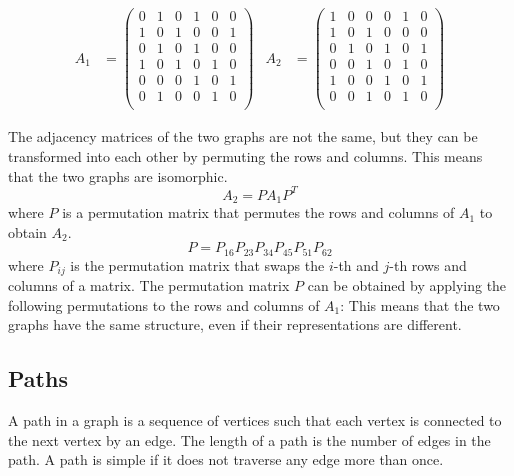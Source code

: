 \documentclass[11pt]{article}
\begin{document}
\begin{align*}
    A_1 &= \begin{pmatrix}
        0 & 1 & 0 & 1 & 0 & 0 \\
        1 & 0 & 1 & 0 & 0 & 1 \\
        0 & 1 & 0 & 1 & 0 & 0 \\
        1 & 0 & 1 & 0 & 1 & 0 \\
        0 & 0 & 0 & 1 & 0 & 1 \\
        0 & 1 & 0 & 0 & 1 & 0 \\
    \end{pmatrix} &
    A_2 &= \begin{pmatrix}
        1 & 0 & 0 & 0 & 1 & 0 \\
        1 & 0 & 1 & 0 & 0 & 0 \\
        0 & 1 & 0 & 1 & 0 & 1 \\
        0 & 0 & 1 & 0 & 1 & 0 \\
        1 & 0 & 0 & 1 & 0 & 1 \\
        0 & 0 & 1 & 0 & 1 & 0 \\
    \end{pmatrix}
\end{align*}

The adjacency matrices of the two graphs are not the same, but they can be transformed into each other by permuting the rows and columns. This means that the two graphs are isomorphic.
\[
A_2 = P A_1 P^T
\]
where $P$ is a permutation matrix that permutes the rows and columns of $A_1$ to obtain $A_2$.
\[
P = P_{16} P_{23} P_{34} P_{45} P_{51} P_{62}
\]
where $P_{ij}$ is the permutation matrix that swaps the $i$-th and $j$-th rows and columns of a matrix. The permutation matrix $P$ can be obtained by applying the following permutations to the rows and columns of $A_1$:
This means that the two graphs have the same structure, even if their representations are different.
   
\subsection{Paths}
A path in a graph is a sequence of vertices such that each vertex is connected to the next vertex by an edge. The length of a path is the number of edges in the path. A path is simple if it does not traverse any edge more than once.
\end{document}
